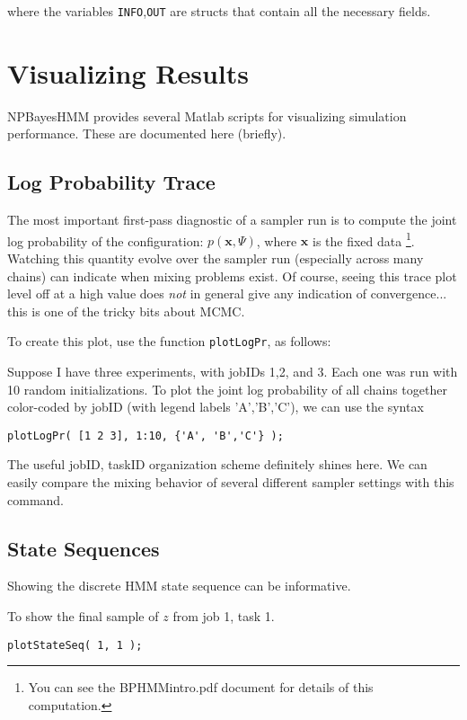 \documentclass[fontsize=12]{article}
\begin{document}
where the variables \texttt{INFO},\texttt{OUT} are structs that contain all the necessary fields.


\section{ Visualizing Results }

NPBayesHMM provides several Matlab scripts for visualizing simulation performance. These are documented here (briefly).

\subsection{ Log Probability Trace }

The most important first-pass diagnostic of a sampler run is to compute the joint log probability of the configuration: $p( \mathbf{x}, \Psi)$, where $\mathbf{x}$ is the fixed data \footnote{You can see the BPHMMintro.pdf document for details of this computation.}.  Watching this quantity evolve over the sampler run (especially across many chains) can indicate when mixing problems exist.  Of course,  seeing this trace plot level off at a high value does \emph{not} in general give any indication of convergence... this is one of the tricky bits about MCMC.


To create this plot, use the function \texttt{plotLogPr}, as follows:

Suppose I have three experiments, with jobIDs 1,2, and 3.  Each one was run with 10 random initializations.  To plot the joint log probability of all chains together color-coded by jobID (with legend labels 'A','B','C'), we can use the syntax
\begin{verbatim}
plotLogPr( [1 2 3], 1:10, {'A', 'B','C'} );
\end{verbatim}

The useful jobID, taskID organization scheme definitely shines here.  We can easily compare the mixing behavior of several different sampler settings with this command.

\subsection{ State Sequences }

Showing the discrete HMM state sequence can be informative. 

To show the final sample of $z$ from job 1, task 1.

\texttt{plotStateSeq( 1, 1 ); }
\end{document}
